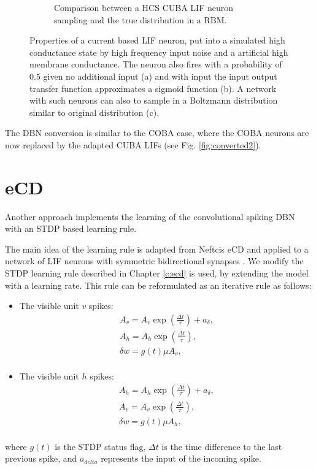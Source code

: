 \begin{figure}
\begin{subfigure}[t]{.5\textwidth}
  		\caption{Comparison between a HCS CUBA LIF neuron sampling and the true distribution in a RBM.}
  		\label{fig:sub2}
	\end{subfigure}
	\caption[Properties of a current based LIF neuron in a high conductance state.]{Properties of a current based LIF neuron, put into a simulated high conductance state by high frequency input noise and a artificial high membrane conductance. The neuron also fires with a probability of $0.5$ given no additional input (a) and with input the input output transfer function approximates a sigmoid function (b). A network with such neurons can also to sample in a Boltzmann distribution similar to original distribution (c).}
	\label{fig:cubahcs}
\end{figure}
The DBN conversion is similar to the COBA case, where the COBA neurons are now replaced by the adapted CUBA LIFs (see Fig. \ref{fig:converted2}).

\section{eCD} \label{c:ecdappr}

Another approach implements the learning of the convolutional spiking DBN with an STDP based learning rule. 

The main idea of the learning rule is adapted from Neftcis eCD and applied to a network of LIF neurons with symmetric bidirectional synapses \cite{Neftci2013}.
We modify the STDP learning rule described in Chapter \ref{c:ecd} is used, by extending the model with a learning rate. 
This rule can be reformulated as an iterative rule as follows:
\begin{itemize}
\item The visible unit $v$ spikes: 
\[
\begin{split}
A_v = A_v \exp(\frac{\Delta t}{\tau}) + a_{\delta} ,\\
A_h = A_h \exp(\frac{\Delta t}{\tau}) ,\\
\delta w = g(t) \mu A_v  ,\\
\end{split}
\]
\item The visible unit $h$ spikes: 
\[
\begin{split}
A_h = A_h \exp(\frac{\Delta t}{\tau}) + a_{\delta} ,\\
A_v = A_v \exp(\frac{\Delta t}{\tau}) ,\\
\delta w = g(t) \mu A_h  ,\\
\end{split}
\]
\end{itemize}
where $g(t)$ is the STDP status flag, $\Delta t$ is the time difference to the last previous spike, and $a_{delta}$ represents the input of the incoming spike.


